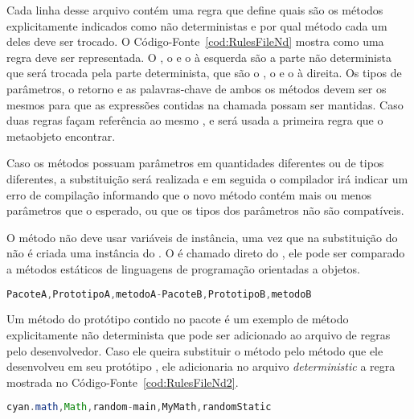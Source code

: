Cada linha desse arquivo contém uma regra que define quais são os métodos explicitamente indicados como não deterministas e por qual método cada um deles deve ser trocado. O Código-Fonte~\ref{cod:RulesFileNd} mostra como uma regra deve ser representada. O , o  e o  à esquerda são a parte não determinista que será trocada pela parte determinista, que são o , o  e o  à direita. Os tipos de parâmetros, o retorno e as palavras-chave de ambos os métodos devem ser os mesmos para que as expressões contidas na chamada possam ser mantidas. Caso duas regras façam referência ao mesmo ,  e  será usada a primeira regra que o metaobjeto encontrar.

Caso os métodos possuam parâmetros em quantidades diferentes ou de tipos diferentes, a substituição será realizada e em seguida o compilador irá indicar um erro de compilação informando que o novo método contém mais ou menos parâmetros que o esperado, ou que os tipos dos parâmetros não são compatíveis.

O método  não deve usar variáveis de instância, uma vez que na substituição do  não é criada uma instância do . O  é chamado direto do , ele pode ser comparado a métodos estáticos de linguagens de programação orientadas a objetos.

\begin{lstlisting}[language=Java, caption={Modelo de regra para indicar não determinismo}, label={cod:RulesFileNd}]
PacoteA,PrototipoA,metodoA-PacoteB,PrototipoB,metodoB
\end{lstlisting}

Um método  do protótipo  contido no pacote  é um exemplo de método explicitamente não determinista que pode ser adicionado ao arquivo de regras pelo desenvolvedor. Caso ele queira substituir o método  pelo método  que ele desenvolveu em seu protótipo , ele adicionaria no arquivo \emph{deterministic} a regra mostrada no Código-Fonte~\ref{cod:RulesFileNd2}.

\begin{lstlisting}[language=Java, caption={Exemplo de regra criada pelo desenvolvedor}, label={cod:RulesFileNd2}]
cyan.math,Math,random-main,MyMath,randomStatic
\end{lstlisting}

